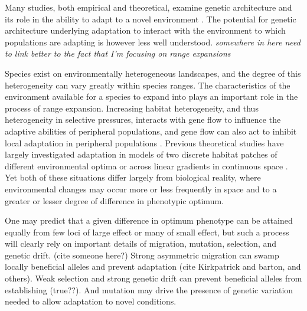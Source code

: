 Many studies, both empirical and theoretical, examine genetic architecture and its role in the ability to adapt to a novel environment \citep{Yeaman:2015, Yeaman:2011, Carroll:2001, Holloway:1990, Peichel:2001, Bratteler:2006}. %
The potential for genetic architecture underlying adaptation to interact with the environment to which populations are adapting is however less well understood. \emph{somewhere in here need to link better to the fact that I'm focusing on range expansions} %

Species exist on environmentally heterogeneous landscapes, and the degree of this heterogeneity can vary greatly within species ranges. The characteristics of the environment available for a species to expand into plays an important role in the process of range expansion\citep{Aguilee:2012, Barton:2001, Pease:1989}. Increasing habitat heterogeneity, and thus heterogeneity in selective pressures, interacts with gene flow to influence the adaptive abilities of peripheral populations, and gene flow can also act to inhibit local adaptation in peripheral populations \citep{Slatkin:1987,Kirkpatrick:1997, Ronce:2001}. Previous theoretical studies have largely investigated adaptation in models of two discrete habitat patches of different environmental optima \citep{Gomulkiewicz:1999, Ronce:2001} or across linear gradients in continuous space \citep{Kirkpatrick:1997, Polechova:2009}. Yet both of these situations differ largely from biological reality, where environmental changes may occur more or less frequently in space and to a greater or lesser degree of difference in phenotypic optimum.

One may predict that a given difference in optimum phenotype can be attained equally from few loci of large effect or many of small effect, but such a process will clearly rely on important details of migration, mutation, selection, and genetic drift. (cite someone here?) Strong asymmetric migration can swamp locally beneficial alleles and prevent adaptation (cite Kirkpatrick and barton, and others). Weak selection and strong genetic drift can prevent beneficial alleles from establishing (true??). And mutation may drive the presence of genetic variation needed to allow adaptation to novel conditions.

